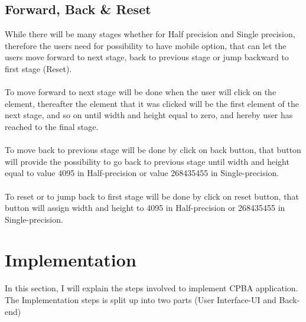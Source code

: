 \documentclass[11pt]{article}
\begin{document}
\subsection{Forward, Back \& Reset}
While there will be many stages whether for Half precision and Single precision, therefore the users need for possibility to have mobile option, that can let the users move forward to next stage, back to previous stage or jump backward to first stage (Reset).\\\\
To move forward to next stage will be done when the user will click on the element, thereafter the element that it was clicked will be the first element of the next stage, and so on until width and height equal to zero, and hereby user has reached to the final stage.\\\\
To move back to previous stage will be done by click on back button, that button will provide the possibility to go back to previous stage until width and height equal to value 4095 in Half-precision or value 268435455 in Single-precision.\\\\
To reset or to jump back to first stage will be done by click on reset button, that button will assign width and height to 4095 in Half-precision or 268435455 in Single-precision.



\section{Implementation}
In this section, I will explain the steps involved to implement CPBA application. The Implementation steps is split up into two parts (User Interface-UI and Back-end)
\end{document}
